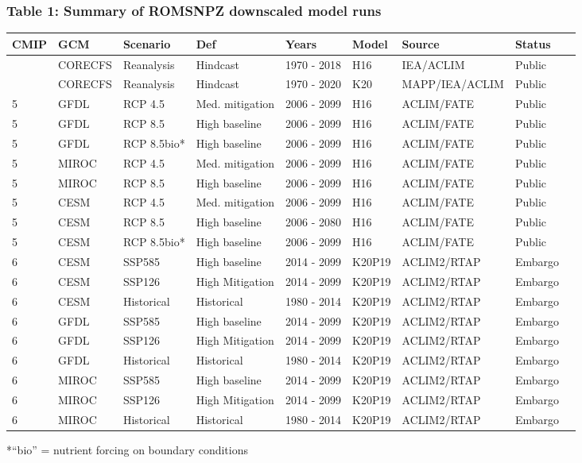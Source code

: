 \documentclass[
]{article}
\begin{document}
\hypertarget{table-1-summary-of-romsnpz-downscaled-model-runs}{%
\subsubsection{Table 1: Summary of ROMSNPZ downscaled model
runs}\label{table-1-summary-of-romsnpz-downscaled-model-runs}}

\begin{longtable}[]{@{}lllllllll@{}}
\toprule
CMIP & GCM & Scenario & Def & Years & Model & Source & Status
&\tabularnewline
\midrule
\endhead
& CORECFS & Reanalysis & Hindcast & 1970 - 2018 & H16 & IEA/ACLIM &
Public &\tabularnewline
& CORECFS & Reanalysis & Hindcast & 1970 - 2020 & K20 & MAPP/IEA/ACLIM &
Public &\tabularnewline
5 & GFDL & RCP 4.5 & Med. mitigation & 2006 - 2099 & H16 & ACLIM/FATE &
Public &\tabularnewline
5 & GFDL & RCP 8.5 & High baseline & 2006 - 2099 & H16 & ACLIM/FATE &
Public &\tabularnewline
5 & GFDL & RCP 8.5bio* & High baseline & 2006 - 2099 & H16 & ACLIM/FATE
& Public &\tabularnewline
5 & MIROC & RCP 4.5 & Med. mitigation & 2006 - 2099 & H16 & ACLIM/FATE &
Public &\tabularnewline
5 & MIROC & RCP 8.5 & High baseline & 2006 - 2099 & H16 & ACLIM/FATE &
Public &\tabularnewline
5 & CESM & RCP 4.5 & Med. mitigation & 2006 - 2099 & H16 & ACLIM/FATE &
Public &\tabularnewline
5 & CESM & RCP 8.5 & High baseline & 2006 - 2080 & H16 & ACLIM/FATE &
Public &\tabularnewline
5 & CESM & RCP 8.5bio* & High baseline & 2006 - 2099 & H16 & ACLIM/FATE
& Public &\tabularnewline
6 & CESM & SSP585 & High baseline & 2014 - 2099 & K20P19 & ACLIM2/RTAP &
Embargo &\tabularnewline
6 & CESM & SSP126 & High Mitigation & 2014 - 2099 & K20P19 & ACLIM2/RTAP
& Embargo &\tabularnewline
6 & CESM & Historical & Historical & 1980 - 2014 & K20P19 & ACLIM2/RTAP
& Embargo &\tabularnewline
6 & GFDL & SSP585 & High baseline & 2014 - 2099 & K20P19 & ACLIM2/RTAP &
Embargo &\tabularnewline
6 & GFDL & SSP126 & High Mitigation & 2014 - 2099 & K20P19 & ACLIM2/RTAP
& Embargo &\tabularnewline
6 & GFDL & Historical & Historical & 1980 - 2014 & K20P19 & ACLIM2/RTAP
& Embargo &\tabularnewline
6 & MIROC & SSP585 & High baseline & 2014 - 2099 & K20P19 & ACLIM2/RTAP
& Embargo &\tabularnewline
6 & MIROC & SSP126 & High Mitigation & 2014 - 2099 & K20P19 &
ACLIM2/RTAP & Embargo &\tabularnewline
6 & MIROC & Historical & Historical & 1980 - 2014 & K20P19 & ACLIM2/RTAP
& Embargo &\tabularnewline
\bottomrule
\end{longtable}

*``bio'' = nutrient forcing on boundary conditions
\end{document}
